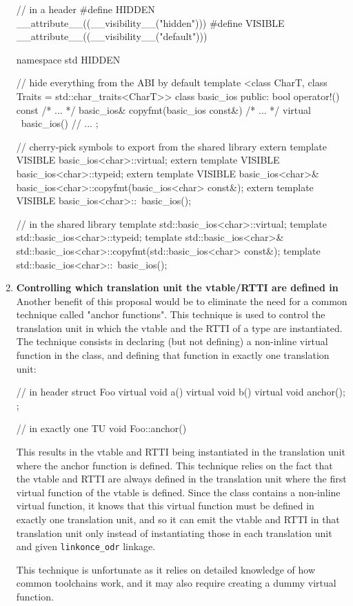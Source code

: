 \documentclass{wg21}
\newcommand{\cc}[1]{\texttt{#1}}
\begin{document}
\begin{enumerate}
  \begin{cpp}
  // in a header
  #define HIDDEN __attribute__((__visibility__("hidden")))
  #define VISIBLE __attribute__((__visibility__("default")))

  namespace std HIDDEN { // hide everything from the ABI by default
    template <class CharT, class Traits = std::char_traits<CharT>>
    class basic_ios {
    public:
      bool operator!() const { /* ... */ }
      basic_ios& copyfmt(basic_ios const&) { /* ... */ }
      virtual ~basic_ios() { }
      // ...
    };

    // cherry-pick symbols to export from the shared library
    extern template VISIBLE basic_ios<char>::virtual;
    extern template VISIBLE basic_ios<char>::typeid;
    extern template VISIBLE basic_ios<char>&
                            basic_ios<char>::copyfmt(basic_ios<char> const&);
    extern template VISIBLE basic_ios<char>::~basic_ios();
  }

  // in the shared library
  template std::basic_ios<char>::virtual;
  template std::basic_ios<char>::typeid;
  template std::basic_ios<char>&
           std::basic_ios<char>::copyfmt(std::basic_ios<char> const&);
  template std::basic_ios<char>::~basic_ios();
  \end{cpp}

  \item \textbf{Controlling which translation unit the vtable/RTTI are defined in}\\
  Another benefit of this proposal would be to eliminate the need for a common
  technique called "anchor functions". This technique is used to control the
  translation unit in which the vtable and the RTTI of a type are instantiated.
  The technique consists in declaring (but not defining) a non-inline virtual
  function in the class, and defining that function in exactly one translation
  unit:

  \begin{cpp}
  // in header
  struct Foo {
    virtual void a() { }
    virtual void b() { }
    virtual void anchor();
  };

  // in exactly one TU
  void Foo::anchor() { }
  \end{cpp}

  This results in the vtable and RTTI being instantiated in the translation unit
  where the anchor function is defined. This technique relies on the fact that
  the vtable and RTTI are always defined in the translation unit where the first
  virtual function of the vtable is defined. Since the class contains a non-inline
  virtual function, it knows that this virtual function must be defined in
  exactly one translation unit, and so it can emit the vtable and RTTI in that
  translation unit only instead of instantiating those in each translation unit
  and given \cc{linkonce_odr} linkage.

  This technique is unfortunate as it relies on detailed knowledge of how common
  toolchains work, and it may also require creating a dummy virtual function.
\end{enumerate}
\end{document}
